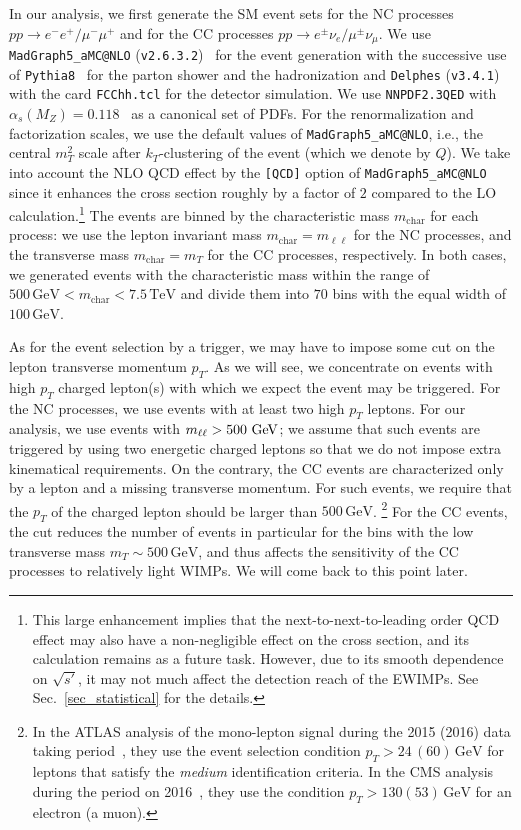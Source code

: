 \documentclass[12pt,twoside,book]{article}
\begin{document}
In our analysis, we first generate the SM event sets for the NC processes $pp\to e^{-}e^{+} / \mu^{-}\mu^{+}$ and for the CC processes $pp\to e^{\pm}\nu_e / \mu^{\pm}\nu_\mu$.
We use \texttt{MadGraph5\_aMC@NLO} (\texttt{v2.6.3.2})~\cite{Alwall:2011uj, Alwall:2014hca} for the event generation with the successive use of \texttt{Pythia8}~\cite{Sjostrand:2014zea} for the parton shower and the hadronization and \texttt{Delphes} (\texttt{v3.4.1})~\cite{deFavereau:2013fsa} with the card {\tt FCChh.tcl} for the detector simulation.
We use \texttt{NNPDF2.3QED} with $\alpha_s (M_Z) = 0.118$~\cite{Ball:2013hta} as a canonical set of PDFs.
For the renormalization and factorization scales, we use the default values of \texttt{MadGraph5\_aMC@NLO}, i.e., the central $m_T^2$ scale after $k_T$-clustering of the event (which we denote by $Q$).
We take into account the NLO QCD effect by the \verb|[QCD]| option of \verb|MadGraph5_aMC@NLO| since it enhances the cross section roughly by a factor of $2$ compared to the LO calculation.\footnote
{
  This large enhancement implies that the next-to-next-to-leading order QCD effect may also have a non-negligible effect on the cross section, and its calculation remains as a future task.
  However, due to its smooth dependence on $\sqrt{s'}$, it may not much affect the detection reach of the EWIMPs.
  See Sec.~\ref{sec_statistical} for the details.
}
The events are binned by the characteristic mass $m_{\mathrm{char}}$ for each process: we use the lepton invariant mass $m_{\mathrm{char}} = m_{\ell\ell}$ for the NC processes, and the transverse mass $m_{\mathrm{char}} = m_T$ for the CC processes, respectively.
In both cases, we generated events with the characteristic mass within the range of $500\,\mathrm{GeV} < m_\mathrm{char} < 7.5\,\mathrm{TeV}$ and divide them into $70$ bins with the equal width of $100\,\mathrm{GeV}$.

As for the event selection by a trigger, we may have to impose some cut on the lepton transverse momentum $p_T$.
As we will see, we concentrate on events with high $p_T$ charged lepton(s) with which we expect the event may be triggered.
For the NC processes, we use events with at least two high $p_T$ leptons.  For our analysis, we use events with $m_{\ell\ell}>500\ {\rm GeV}$; we assume that such events are triggered by using two energetic charged leptons so that we do not impose extra kinematical requirements.
On the contrary, the CC events are characterized only by a lepton and a missing transverse momentum.
For such events, we require that the $p_T$ of the charged lepton should be larger than $500\,\mathrm{GeV}$.
\footnote{
  In the ATLAS analysis of the mono-lepton signal during the 2015 (2016) data taking period~\cite{Aaboud:2017efa}, they use the event selection condition $p_T > 24\, (60)\,\mathrm{GeV}$ for leptons that satisfy the \textit{medium} identification criteria.
  In the CMS analysis during the period on 2016~\cite{Sirunyan:2018mpc}, they use the condition $p_T > 130 (53)\, \mathrm{GeV}$ for an electron (a muon).
}
For the CC events, the cut reduces the number of events in particular for the bins with the low transverse mass $m_T \sim 500\, \mathrm{GeV}$, and thus affects the sensitivity of the CC processes to relatively light WIMPs.
We will come back to this point later.
\end{document}
